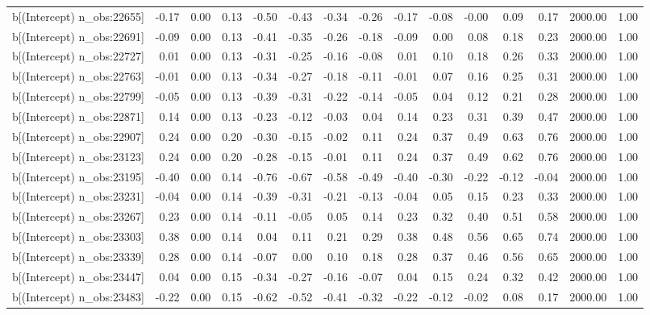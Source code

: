\begin{table}[ht]
\begin{tabular}{rrrrrrrrrrrrrrr}
  b[(Intercept) n\_obs:22655] & -0.17 & 0.00 & 0.13 & -0.50 & -0.43 & -0.34 & -0.26 & -0.17 & -0.08 & -0.00 & 0.09 & 0.17 & 2000.00 & 1.00 \\ 
  b[(Intercept) n\_obs:22691] & -0.09 & 0.00 & 0.13 & -0.41 & -0.35 & -0.26 & -0.18 & -0.09 & 0.00 & 0.08 & 0.18 & 0.23 & 2000.00 & 1.00 \\ 
  b[(Intercept) n\_obs:22727] & 0.01 & 0.00 & 0.13 & -0.31 & -0.25 & -0.16 & -0.08 & 0.01 & 0.10 & 0.18 & 0.26 & 0.33 & 2000.00 & 1.00 \\ 
  b[(Intercept) n\_obs:22763] & -0.01 & 0.00 & 0.13 & -0.34 & -0.27 & -0.18 & -0.11 & -0.01 & 0.07 & 0.16 & 0.25 & 0.31 & 2000.00 & 1.00 \\ 
  b[(Intercept) n\_obs:22799] & -0.05 & 0.00 & 0.13 & -0.39 & -0.31 & -0.22 & -0.14 & -0.05 & 0.04 & 0.12 & 0.21 & 0.28 & 2000.00 & 1.00 \\ 
  b[(Intercept) n\_obs:22871] & 0.14 & 0.00 & 0.13 & -0.23 & -0.12 & -0.03 & 0.04 & 0.14 & 0.23 & 0.31 & 0.39 & 0.47 & 2000.00 & 1.00 \\ 
  b[(Intercept) n\_obs:22907] & 0.24 & 0.00 & 0.20 & -0.30 & -0.15 & -0.02 & 0.11 & 0.24 & 0.37 & 0.49 & 0.63 & 0.76 & 2000.00 & 1.00 \\ 
  b[(Intercept) n\_obs:23123] & 0.24 & 0.00 & 0.20 & -0.28 & -0.15 & -0.01 & 0.11 & 0.24 & 0.37 & 0.49 & 0.62 & 0.76 & 2000.00 & 1.00 \\ 
  b[(Intercept) n\_obs:23195] & -0.40 & 0.00 & 0.14 & -0.76 & -0.67 & -0.58 & -0.49 & -0.40 & -0.30 & -0.22 & -0.12 & -0.04 & 2000.00 & 1.00 \\ 
  b[(Intercept) n\_obs:23231] & -0.04 & 0.00 & 0.14 & -0.39 & -0.31 & -0.21 & -0.13 & -0.04 & 0.05 & 0.15 & 0.23 & 0.33 & 2000.00 & 1.00 \\ 
  b[(Intercept) n\_obs:23267] & 0.23 & 0.00 & 0.14 & -0.11 & -0.05 & 0.05 & 0.14 & 0.23 & 0.32 & 0.40 & 0.51 & 0.58 & 2000.00 & 1.00 \\ 
  b[(Intercept) n\_obs:23303] & 0.38 & 0.00 & 0.14 & 0.04 & 0.11 & 0.21 & 0.29 & 0.38 & 0.48 & 0.56 & 0.65 & 0.74 & 2000.00 & 1.00 \\ 
  b[(Intercept) n\_obs:23339] & 0.28 & 0.00 & 0.14 & -0.07 & 0.00 & 0.10 & 0.18 & 0.28 & 0.37 & 0.46 & 0.56 & 0.65 & 2000.00 & 1.00 \\ 
  b[(Intercept) n\_obs:23447] & 0.04 & 0.00 & 0.15 & -0.34 & -0.27 & -0.16 & -0.07 & 0.04 & 0.15 & 0.24 & 0.32 & 0.42 & 2000.00 & 1.00 \\ 
  b[(Intercept) n\_obs:23483] & -0.22 & 0.00 & 0.15 & -0.62 & -0.52 & -0.41 & -0.32 & -0.22 & -0.12 & -0.02 & 0.08 & 0.17 & 2000.00 & 1.00 \\ 

\end{tabular}
\end{table}
